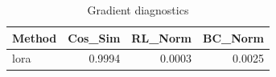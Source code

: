 \begin{table}[htbp]
\centering
\caption{Gradient diagnostics}
\label{tab:grad-diag}
\begin{tabular}{lrrr}
\toprule
\textbf{Method} & \textbf{Cos\_Sim} & \textbf{RL\_Norm} & \textbf{BC\_Norm} \\
\midrule
lora & 0.9994 & 0.0003 & 0.0025 \\
\bottomrule
\end{tabular}
\end{table}